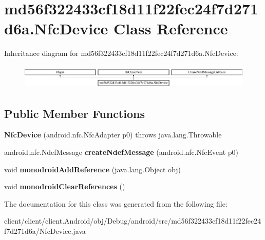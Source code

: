 \hypertarget{classmd56f322433cf18d11f22fec24f7d271d6a_1_1NfcDevice}{}\section{md56f322433cf18d11f22fec24f7d271d6a.\+Nfc\+Device Class Reference}
\label{classmd56f322433cf18d11f22fec24f7d271d6a_1_1NfcDevice}
Inheritance diagram for md56f322433cf18d11f22fec24f7d271d6a.\+Nfc\+Device\+:\begin{figure}[H]
\begin{center}
\leavevmode
\includegraphics[height=1.181435cm]{classmd56f322433cf18d11f22fec24f7d271d6a_1_1NfcDevice}
\end{center}
\end{figure}
\subsection*{Public Member Functions}
\begin{DoxyCompactItemize}
\item 
\hypertarget{classmd56f322433cf18d11f22fec24f7d271d6a_1_1NfcDevice_affc325e8f1b96c7517598a4e93bf3ba2}{}{\bfseries Nfc\+Device} (android.\+nfc.\+Nfc\+Adapter p0)  throws java.\+lang.\+Throwable 	\label{classmd56f322433cf18d11f22fec24f7d271d6a_1_1NfcDevice_affc325e8f1b96c7517598a4e93bf3ba2}

\item 
\hypertarget{classmd56f322433cf18d11f22fec24f7d271d6a_1_1NfcDevice_ad419c9587b4b8e20b23614977cdb7b5f}{}android.\+nfc.\+Ndef\+Message {\bfseries create\+Ndef\+Message} (android.\+nfc.\+Nfc\+Event p0)\label{classmd56f322433cf18d11f22fec24f7d271d6a_1_1NfcDevice_ad419c9587b4b8e20b23614977cdb7b5f}

\item 
\hypertarget{classmd56f322433cf18d11f22fec24f7d271d6a_1_1NfcDevice_a3d5eddf1ef897c1690bde10c4ea18c6b}{}void {\bfseries monodroid\+Add\+Reference} (java.\+lang.\+Object obj)\label{classmd56f322433cf18d11f22fec24f7d271d6a_1_1NfcDevice_a3d5eddf1ef897c1690bde10c4ea18c6b}

\item 
\hypertarget{classmd56f322433cf18d11f22fec24f7d271d6a_1_1NfcDevice_ae2b7d73737c00b3fb67df787045cf0f3}{}void {\bfseries monodroid\+Clear\+References} ()\label{classmd56f322433cf18d11f22fec24f7d271d6a_1_1NfcDevice_ae2b7d73737c00b3fb67df787045cf0f3}

\end{DoxyCompactItemize}


The documentation for this class was generated from the following file\+:\begin{DoxyCompactItemize}
\item 
client/client/client.\+Android/obj/\+Debug/android/src/md56f322433cf18d11f22fec24f7d271d6a/Nfc\+Device.\+java\end{DoxyCompactItemize}
